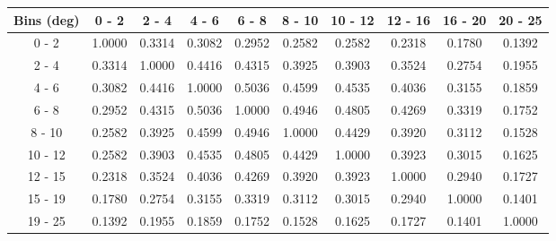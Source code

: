\documentclass[aps, prd, reprint,showpacs,  preprintnumbers,amsmath,amssymb,superscriptaddress, nofootinbib]{revtex4-1}
\makeatletter
\renewenvironment{table}
  {\def\@captype{table}}
  {}
\makeatother
\begin{document}
\begin{table}
\centering
\begin{tabular}{cccccccccc}
\hline
Bins (deg) & 0 - 2 & 2 - 4 & 4 - 6 & 6 - 8 & 8 - 10 & 10 - 12 & 12 - 16 & 16 - 20 & 20 - 25 \\ 
\hline
  0 -  2    &     1.0000  &     0.3314  &     0.3082  &     0.2952  &     0.2582  &     0.2582  &     0.2318  &     0.1780  &     0.1392   \\ 
  2 -  4    &     0.3314  &     1.0000  &     0.4416  &     0.4315  &     0.3925  &     0.3903  &     0.3524  &     0.2754  &     0.1955   \\ 
  4 -  6    &     0.3082  &     0.4416  &     1.0000  &     0.5036  &     0.4599  &     0.4535  &     0.4036  &     0.3155  &     0.1859   \\ 
  6 -  8    &     0.2952  &     0.4315  &     0.5036  &     1.0000  &     0.4946  &     0.4805  &     0.4269  &     0.3319  &     0.1752   \\ 
  8 - 10    &     0.2582  &     0.3925  &     0.4599  &     0.4946  &     1.0000  &     0.4429  &     0.3920  &     0.3112  &     0.1528   \\ 
 10 - 12    &     0.2582  &     0.3903  &     0.4535  &     0.4805  &     0.4429  &     1.0000  &     0.3923  &     0.3015  &     0.1625   \\ 
 12 - 15    &     0.2318  &     0.3524  &     0.4036  &     0.4269  &     0.3920  &     0.3923  &     1.0000  &     0.2940  &     0.1727   \\ 
 15 - 19    &     0.1780  &     0.2754  &     0.3155  &     0.3319  &     0.3112  &     0.3015  &     0.2940  &     1.0000  &     0.1401   \\ 
 19 - 25    &     0.1392  &     0.1955  &     0.1859  &     0.1752  &     0.1528  &     0.1625  &     0.1727  &     0.1401  &     1.0000   \\ 
\hline
\hline
\end{tabular}
\caption{Correlation matrix for bins of $d\sigma/d\theta_\mu$.}
\label{tb:pi0_muth_cov}
\end{table}

\vspace{0.7cm}
\end{document}
